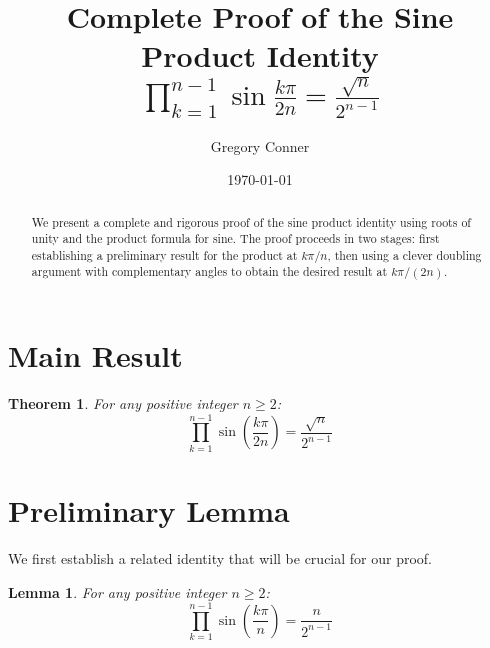 \documentclass{article}
\title{Complete Proof of the Sine Product Identity\\[0.3cm]
{\large $\displaystyle\prod_{k=1}^{n-1} \sin\frac{k\pi}{2n} = \frac{\sqrt{n}}{2^{n-1}}$}}
\author{Gregory Conner}
\date{\today}
\newtheorem{theorem}{Theorem}
\newtheorem{lemma}{Lemma}
\begin{document}
\maketitle

\begin{abstract}
We present a complete and rigorous proof of the sine product identity using roots of unity and the product formula for sine. The proof proceeds in two stages: first establishing a preliminary result for the product at $k\pi/n$, then using a clever doubling argument with complementary angles to obtain the desired result at $k\pi/(2n)$.
\end{abstract}

\section{Main Result}

\begin{theorem}
For any positive integer $n \geq 2$:
\begin{equation}
\prod_{k=1}^{n-1} \sin\left(\frac{k\pi}{2n}\right) = \frac{\sqrt{n}}{2^{n-1}}
\end{equation}
\end{theorem}

\section{Preliminary Lemma}

We first establish a related identity that will be crucial for our proof.

\begin{lemma}
For any positive integer $n \geq 2$:
\begin{equation}
\prod_{k=1}^{n-1} \sin\left(\frac{k\pi}{n}\right) = \frac{n}{2^{n-1}}
\end{equation}
\end{lemma}
\end{document}
